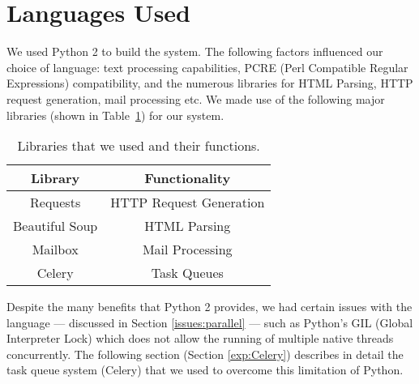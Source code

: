 \section{Languages Used}

We used Python 2 to build the system. The following factors influenced our choice of language: text processing capabilities, PCRE (Perl Compatible Regular Expressions) compatibility, and the numerous libraries for HTML Parsing, HTTP request generation, mail processing etc.
We made use of the following major libraries (shown in Table~\ref{tab:libs}) for our system.

\begin{table}[!htbp]
	\centering
	\begin{tabular}{|c|c|}
		\hline
		\multicolumn{1}{|c|}{\textbf{Library}} &
		\multicolumn{1}{c|}{\textbf{Functionality}} \\
		\hline
		Requests & HTTP Request Generation\\
		\hline
		Beautiful Soup & HTML Parsing\\
		\hline
		Mailbox & Mail Processing\\
		\hline
		Celery & Task Queues\\
		\hline
	\end{tabular}
	\caption[]{Libraries that we used and their functions.}
	\label{tab:libs}
\end{table}

Despite the many benefits that Python 2 provides, we had certain issues with the language --- discussed in Section \ref{issues:parallel} --- such as Python's GIL (Global Interpreter Lock) which does not allow the running of multiple native threads concurrently.
The following section (Section \ref{exp:Celery}) describes in detail the task queue system (Celery) that we used to overcome this limitation of Python.

